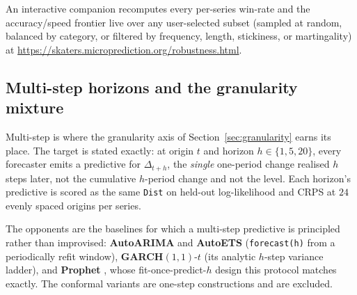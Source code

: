 \documentclass[article]{jss}
\providecommand{\pkg}[1]{\textbf{#1}}
\providecommand{\code}[1]{\texttt{#1}}
\begin{document}
An interactive companion recomputes every
per-series win-rate and the accuracy/speed frontier live over any user-selected
subset (sampled at random, balanced by category, or filtered by frequency,
length, stickiness, or martingality) at
\url{https://skaters.microprediction.org/robustness.html}.

\subsection{Multi-step horizons and the granularity mixture} \label{sec:multistep}

Multi-step is where the granularity axis of Section~\ref{sec:granularity}
earns its place. The target is stated exactly: at origin $t$ and horizon $h \in
\{1, 5, 20\}$, every forecaster emits a predictive for $\Delta_{t+h}$, the
\emph{single} one-period change realised $h$ steps later, not the cumulative
$h$-period change and not the level. Each horizon's predictive is scored as the
same \code{Dist} on held-out log-likelihood and CRPS at $24$ evenly spaced
origins per series.

The opponents are the baselines for which a multi-step
predictive is principled rather than improvised: \pkg{AutoARIMA} and
\pkg{AutoETS} (\code{forecast(h)} from a periodically refit window),
\pkg{GARCH}$(1,1)$-$t$ (its analytic $h$-step variance ladder), and
\pkg{Prophet} \citep{taylor2018prophet}, whose fit-once-predict-$h$ design this
protocol matches exactly. The conformal variants are one-step constructions and
are excluded.
\end{document}
